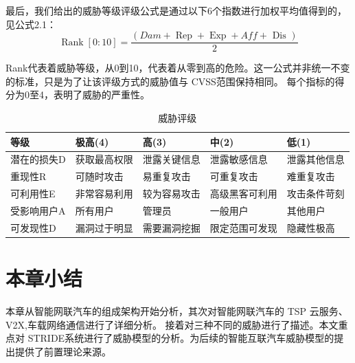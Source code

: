 最后，我们给出的威胁等级评级公式是通过以下6个指数进行加权平均值得到的，见公式2.1：
\begin{equation}
\operatorname{Rank}[0: 10]=\frac{(D a m+\operatorname{Rep}+\operatorname{Exp}+A f f+\text { Dis })}{2}
\end{equation}

Rank代表着威胁等级，从0到10，代表着从零到高的危险。这一公式并非统一不变的标准，只是为了让该评级方式的威胁值与 CVSS范围保持相同。
每个指标的得分为0至4，表明了威胁的严重性。

\begin{table}
  \caption{威胁评级}
\begin{center}
  \begin{tabular}{|l|l|l|l|l|}
    \hline 等级 & 极高(4) & 高(3) & 中(2) & 低(1) \\
    \hline 潜在的损失D & 获取最高权限 & 泄露关键信息 & 泄露敏感信息 & 泄露其他信息 \\
    \hline 重现性R & 可随时攻击 & 易重复攻击 & 可重复攻击 & 难重复攻击 \\
    \hline 可利用性E & 非常容易利用 & 较为容易攻击 & 高级黑客可利用 & 攻击条件苛刻 \\
    \hline 受影响用户A & 所有用户 & 管理员 & 一般用户 & 其他用户 \\
    \hline 可发现性D & 漏洞过于明显 & 需要漏洞挖掘 & 限定范围可发现 & 隐藏性极高 \\
    \hline
    \end{tabular}
\end{center}
\end{table}




    

\section{本章小结}

本章从智能网联汽车的组成架构开始分析，其次对智能网联汽车的 TSP 云服务、V2X,车载网络通信进行了详细分析。
接着对三种不同的威胁进行了描述。本文重点对 STRIDE系统进行了威胁模型的分析。为后续的智能互联汽车威胁模型的提出提供了前置理论来源。